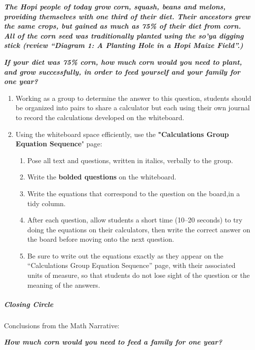 \documentclass[12pt,]{article}
\providecommand{\tightlist}{%
  \setlength{\itemsep}{0pt}\setlength{\parskip}{0pt}}
\let\oldsubparagraph\subparagraph
\renewcommand{\subparagraph}[1]{\oldsubparagraph{#1}\mbox{}}
\begin{document}
\textbf{\emph{The Hopi people of today grow corn, squash, beans and melons, providing themselves with one third of their diet. Their ancestors grew the same crops, but gained as much as 75\% of their diet from corn. All of the corn seed was traditionally planted using the so'ya digging stick (review ``Diagram 1: A Planting Hole in a Hopi Maize Field''.)}}

\textbf{\emph{If your diet was 75\% corn, how much corn would you need to plant, and grow successfully, in order to feed yourself and your family for one year? }}

\begin{enumerate}
\def\labelenumi{\arabic{enumi}.}
\tightlist
\item
  Working as a group to determine the answer to this question, students should be organized into pairs to share a calculator but each using their own journal to record the calculations developed on the whiteboard.
\item
  Using the whiteboard space efficiently, use the \textbf{"Calculations Group Equation Sequence}" page:

  \begin{enumerate}
  \def\labelenumii{\arabic{enumii}.}
  \tightlist
  \item
    Pose all text and questions, written in italics, verbally to the group.
  \item
    Write the \textbf{bolded questions }on the whiteboard.
  \item
    Write the equations that correspond to the question on the board,in a tidy column.
  \item
    After each question, allow students a short time (10--20 seconds) to try doing the equations on their calculators, then write the correct answer on the board before moving onto the next question.
  \item
    Be sure to write out the equations exactly as they appear on the ``Calculations Group Equation Sequence'' page, with their associated units of measure, so that students do not lose sight of the question or the meaning of the answers.
  \end{enumerate}
\end{enumerate}

\hypertarget{closing-circle-3}{%
\subparagraph{Closing Circle}\label{closing-circle-3}}

Conclusions from the Math Narrative:

\textbf{\emph{How much corn would you need to feed a family for one year? }}
\end{document}
